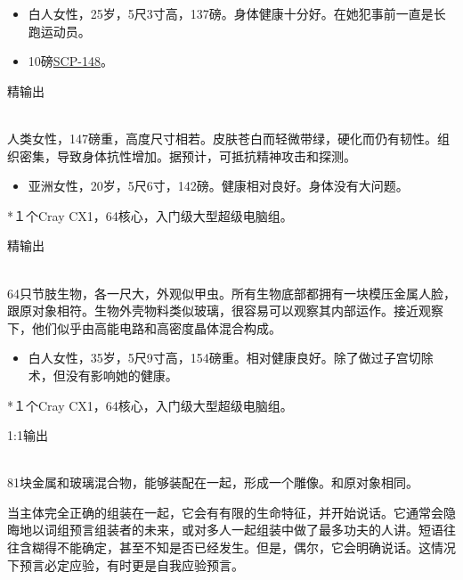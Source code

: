 


\begin{itemize}
\item 白人女性，25岁，5尺3寸高，137磅。身体健康十分好。在她犯事前一直是长跑运动员。
\item 10磅\hyperref[chap:SCP-148]{SCP-148}。
\end{itemize}

精输出

\\
人类女性，147磅重，高度尺寸相若。皮肤苍白而轻微带绿，硬化而仍有韧性。组织密集，导致身体抗性增加。据预计，可抵抗精神攻击和探测。




\begin{itemize}
\item 亚洲女性，20岁，5尺6寸，142磅。健康相对良好。身体没有大问题。
\end{itemize}

*１个Cray CX1，64核心，入门级大型超级电脑组。

精输出

\\
64只节肢生物，各一尺大，外观似甲虫。所有生物底部都拥有一块模压金属人脸，跟原对象相符。生物外壳物料类似玻璃，很容易可以观察其内部运作。接近观察下，他们似乎由高能电路和高密度晶体混合构成。




\begin{itemize}
\item 白人女性，35岁，5尺9寸高，154磅重。相对健康良好。除了做过子宫切除术，但没有影响她的健康。
\end{itemize}

*１个Cray CX1，64核心，入门级大型超级电脑组。

1:1输出

\\
81块金属和玻璃混合物，能够装配在一起，形成一个雕像。和原对象相同。

当主体完全正确的组装在一起，它会有有限的生命特征，并开始说话。它通常会隐晦地以词组预言组装者的未来，或对多人一起组装中做了最多功夫的人讲。短语往往含糊得不能确定，甚至不知是否已经发生。但是，偶尔，它会明确说话。这情况下预言必定应验，有时更是自我应验预言。

